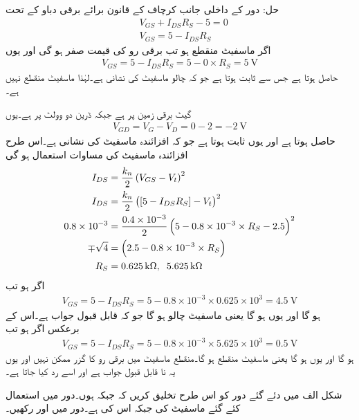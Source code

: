 حل:	دور کے داخلی جانب کرچاف کے قانون برائے برقی دباو کے تحت
\begin{align*}
& V_{GS}+I_{DS}R_S-5=0\\
& V_{GS}=5-I_{DS}R_S
\end{align*}
اگر ماسفیٹ منقطع ہو تب برقی رو کی قیمت صفر ہو گی اور یوں
\begin{align*}
V_{GS}=5-I_{DS}R_S=5-0 \times R_S =\SI{5}{\volt}
\end{align*}
حاصل ہوتا ہے جس سے   ثابت ہوتا ہے جو کہ چالو ماسفیٹ کی نشانی ہے۔لہٰذا ماسفیٹ منقطع نہیں ہے۔

گیٹ برقی زمین پر ہے جبکہ ڈرین دو وولٹ پر ہے۔یوں
\begin{align*}
V_{GD}=V_{G}-V_{D}=0-2=\SI{-2}{\volt}
\end{align*}
حاصل ہوتا ہے اور یوں  ثابت ہوتا ہے جو کہ افزائندہ ماسفیٹ کی نشانی ہے۔اس طرح افزائندہ ماسفیٹ کی مساوات استعمال ہو گی
\begin{align*}
I_{DS}&=\frac{k_n}{2} \left(V_{GS}-V_t \right )^{2}\\
I_{DS}&=\frac{k_n}{2} \left([5-I_{DS}R_S]-V_t \right )^{2}\\
0.8 \times 10^{-3}&=\frac{0.4 \times 10^{-3}}{2} \left(5-0.8 \times 10^{-3} \times R_S-2.5 \right )^{2}\\
\mp \sqrt{4}&=\left(2.5-0.8 \times 10^{-3} \times R_S \right )\\
R_S&=\SI{0.625}{\kilo \ohm},\hspace{2mm} \SI{5.625}{\kilo \ohm}
\end{align*}
اگر  ہو تب
\begin{align*}
V_{GS}=5-I_{DS}R_S=5-0.8 \times 10^{-3} \times 0.625 \times 10^{3}=\SI{4.5}{\volt}
\end{align*}
ہو گا اور یوں  ہو گا یعنی ماسفیٹ چالو ہو گا جو کہ قابل قبول جواب ہے۔اس کے برعکس اگر  
ہو تب
\begin{align*}
V_{GS}=5-I_{DS}R_S=5-0.8 \times 10^{-3} \times 5.625 \times 10^3 =\SI{0.5}{\volt}
\end{align*}
ہو گا اور یوں  ہو گا یعنی ماسفیٹ منقطع ہو گا۔منقطع ماسفیٹ میں برقی رو کا گزر ممکن نہیں اور یوں یہ نا قابل قبول جواب ہے اور اسے رد کیا جاتا ہے۔


شکل  الف میں دئے گئے دور کو اس طرح تخلیق کریں کہ   جبکہ  ہوں۔دور میں استعمال کئے گئے ماسفیٹ کی   جبکہ اس کی   ہے۔دور میں  اور  رکھیں۔

